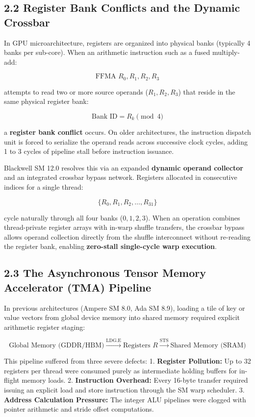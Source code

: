 \documentclass[11pt,twoside,openright]{amsbook}
\begin{document}
{{{{{{{\subsection{2.2 Register Bank Conflicts and the Dynamic Crossbar}

In GPU microarchitecture, registers are organized into physical banks (typically 4 banks per sub-core). When an arithmetic instruction such as a fused multiply-add:

$$\text{FFMA } R_0, R_1, R_2, R_3$$

attempts to read two or more source operands ($R_1, R_2, R_3$) that reside in the same physical register bank:

$$\text{Bank ID} = R_k \pmod 4$$

a \textbf{register bank conflict} occurs. On older architectures, the instruction dispatch unit is forced to serialize the operand reads across successive clock cycles, adding 1 to 3 cycles of pipeline stall before instruction issuance.

Blackwell SM 12.0 resolves this via an expanded \textbf{dynamic operand collector} and an integrated crossbar bypass network. Registers allocated in consecutive indices for a single thread:

$$\{R_{0}, R_{1}, R_{2}, \dots, R_{31}\}$$

cycle naturally through all four banks ($0, 1, 2, 3$). When an operation combines thread-private register arrays with in-warp shuffle transfers, the crossbar bypass allows operand collection directly from the shuffle interconnect without re-reading the register bank, enabling \textbf{zero-stall single-cycle warp execution}.

\subsection{2.3 The Asynchronous Tensor Memory Accelerator (TMA) Pipeline}

In previous architectures (Ampere SM 8.0, Ada SM 8.9), loading a tile of key or value vectors from global device memory into shared memory required explicit arithmetic register staging:

$$\text{Global Memory (GDDR/HBM)} \xrightarrow{\text{LDG.E}} \text{Registers } R \xrightarrow{\text{STS}} \text{Shared Memory (SRAM)}$$

This pipeline suffered from three severe defects:
1. \textbf{Register Pollution:} Up to 32 registers per thread were consumed purely as intermediate holding buffers for in-flight memory loads.
2. \textbf{Instruction Overhead:} Every 16-byte transfer required issuing an explicit load and store instruction through the SM warp scheduler.
3. \textbf{Address Calculation Pressure:} The integer ALU pipelines were clogged with pointer arithmetic and stride offset computations.

}}}}}}}
\end{document}
